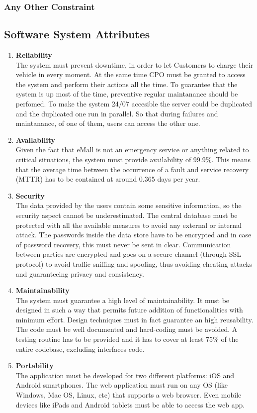 \subsubsection{Any Other Constraint}

\subsection{Software System Attributes}

\begin{enumerate}[label=\textbf{NFR\arabic*}:]
    \item \textbf{Reliability}\\
    The system must prevent downtime, in order to let Customers to charge their vehicle in every moment. At the same time CPO must be granted to access the system and perform their actions all the time.
    To guarantee that the system is up most of the time, preventive regular maintanance should be perfomed. To make the system 24/07 accesible the server could be duplicated and the duplicated one run in parallel. So that during failures and maintanance, of one of them, users can access the other one. 
    \item \textbf{Availability}\\
    Given the fact that eMall is not an emergency service or anything related to critical situations, the system must provide availability of 99.9\%. This means that the average time between the occurrence of a fault and service recovery (MTTR) has to be contained at around 0.365 days per year.
    \item \textbf{Security}\\
    The data provided by the users contain some sensitive information, so the security aspect cannot be underestimated. The central database must be protected with all the available measures to avoid any external or internal attack. The passwords inside the data store have to be encrypted and in case of password recovery, this must never be sent in clear.
    Communication between parties are encrypted and goes on a secure channel (through SSL protocol) to avoid traffic sniffing and spoofing, thus avoiding cheating attacks and guaranteeing privacy and consistency.
    \item \textbf{Maintainability}\\
    The system must guarantee a high level of maintainability. It must be designed in such a way that permits future addition of functionalities with minimum effort.
    Design techniques must in fact guarantee an high reusability. The code must be well documented and hard-coding must be avoided. A testing routine has to be provided and it has to cover at least 75\% of the entire codebase, excluding interfaces code.
    \item \textbf{Portability}\\
    The application must be developed for two different platforms: iOS and Android smartphones. The web application must run on any OS (like Windows, Mac OS, Linux, etc) that supports a web browser. Even mobile devices like iPads and Android tablets must be able to access the web app.
\end{enumerate}

